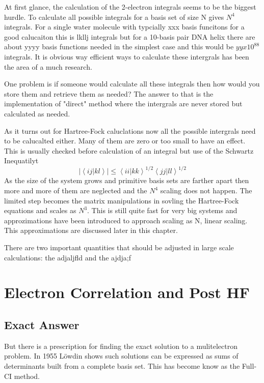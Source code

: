   At first glance, the calculation of the 2-electron integrals seems to be the biggest hurdle.  To calculate all possible integrals for a basis set of size N gives $N^4$ integrals.  For a single water molecule with typcially xxx basis funcitons for a good calucaiton this is lkllj integrals but for a 10-basis pair DNA helix there are about yyyy basis functions needed in the simplest case and this would be $yyx10^{88}$ integrals.  It is obvious way efficient ways to calculate these intergrals has been the area of a much research.
  
  One problem is if someone would calculate all these integrals then how would you store them and retrieve them as needed?  The answer to that is the implementation of "direct" method where the intergrals are never stored but calculated as needed.
  
    As it turns out for Hartree-Fock caluclations now all the possible intergrals need to be calucalted either.  Many of them are zero or too small to have an effect.  This is usually checked before calculation of an integral but use of the Schwartz Inequatilyt
\begin{equation}
  \left| \left\langle ij|kl \right\rangle\right| \leq  \left\langle i i | k k \right\rangle^{1/2} \left\langle j j | l l \right\rangle^{1/2}
\end{equation}
As the size of the system grows and primitive basis sets are farther apart then more and more of them are neglected and the $N^4$ scaling does not happen.  The limited step becomes the matrix manipulations in sovling the Hartree-Fock equations and scales as $N^3$.  This is still quite fast for very big systems and approzimations have been introduced to approach scaling as N, linear scaling.  This approximations are discussed later in this chapter.

   There are two important quantities that should be adjusted in large scale calculations: the adjaljfld  and the ajdja;f
   
   
  


\section{Electron Correlation and Post HF}

\subsection{Exact Answer}
 But there is a prescription for finding the exact solution to a mulitelectron problem.  In 1955 L\"owdin\cite{POL55} shows such solutions can be expressed as sums of determinants built from a complete basis set.  This has become know as the Full-CI method.
  
